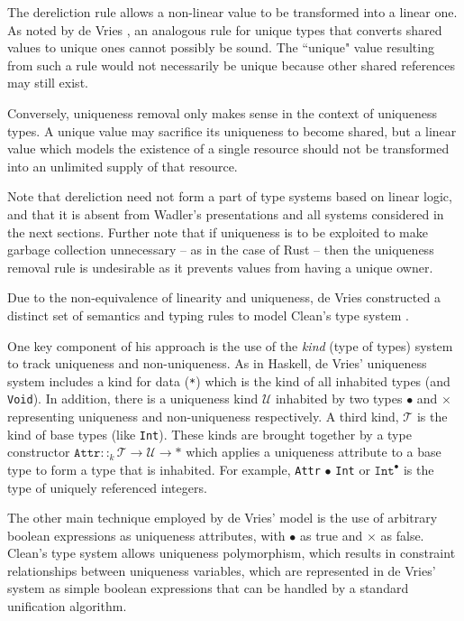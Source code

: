 \documentclass[]{unswthesis}
\let\c\texttt
\let\i\textit
\begin{document}
The dereliction rule allows a non-linear value to be transformed into a linear one. As noted by de Vries \cite{deVriesPhD08}, an analogous rule for unique types that converts shared values to unique ones cannot possibly be sound. The ``unique" value resulting from such a rule would not necessarily be unique because other shared references may still exist.

Conversely, uniqueness removal only makes sense in the context of uniqueness types. A unique value may sacrifice its uniqueness to become shared, but a linear value which models the existence of a single resource should not be transformed into an unlimited supply of that resource.

Note that dereliction need not form a part of type systems based on linear logic, and that it is absent from Wadler's presentations \cite{wadler90, wadler93} and all systems considered in the next sections. Further note that if uniqueness is to be exploited to make garbage collection unnecessary -- as in the case of Rust -- then the uniqueness removal rule is undesirable as it prevents values from having a unique owner.

Due to the non-equivalence of linearity and uniqueness, de Vries constructed a distinct set of semantics and typing rules to model Clean's type system \cite{deVries07}.

One key component of his approach is the use of the \i{kind} (type of types) system to track uniqueness and non-uniqueness. As in Haskell, de Vries' uniqueness system includes a kind for data (\c{*}) which is the kind of all inhabited types (and \c{Void}). In addition, there is a uniqueness kind $\mathcal{U}$ inhabited by two types $\bullet$ and $\times$ representing uniqueness and non-uniqueness respectively. A third kind, $\mathcal{T}$ is the kind of base types (like \c{Int}). These kinds are brought together by a type constructor $\c{Attr} ::_k \mathcal{T} \rightarrow \mathcal{U} \rightarrow *$ which applies a uniqueness attribute to a base type to form a type that is inhabited. For example, \c{Attr} $\bullet$ \c{Int} or $\c{Int}^\bullet$ is the type of uniquely referenced integers.

The other main technique employed by de Vries' model is the use of arbitrary boolean expressions as uniqueness attributes, with $\bullet$ as true and $\times$ as false. Clean's type system allows uniqueness polymorphism, which results in constraint relationships between uniqueness variables, which are represented in de Vries' system as simple boolean expressions that can be handled by a standard unification algorithm.
\end{document}

